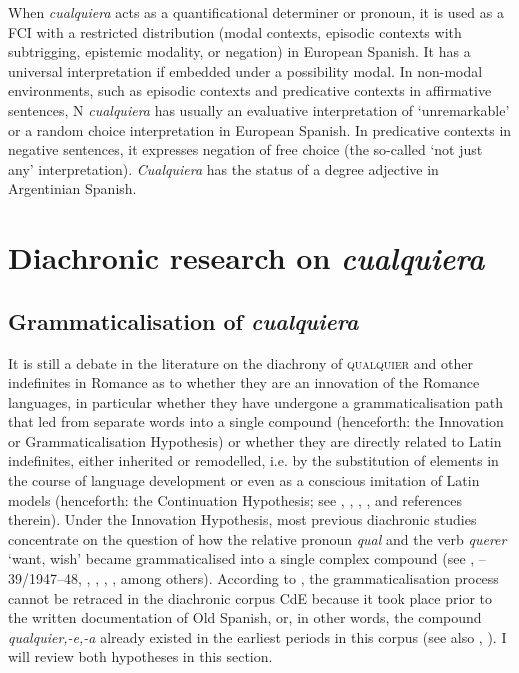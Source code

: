 When \textit{cualquiera} acts as a quantificational determiner or pronoun, it is used as a FCI with a restricted distribution (modal contexts, episodic contexts with subtrigging, epistemic modality, or negation) in European Spanish. It has a universal interpretation if embedded under a possibility modal. In non-modal environments, such as episodic contexts and predicative contexts in affirmative sentences, N \textit{cualquiera} has usually an evaluative interpretation of ‘unremarkable’ or a random choice interpretation in European Spanish. In predicative contexts in negative sentences, it expresses negation of free choice (the so-called ‘not just any’ interpretation). \textit{Cualquiera} has the status of a degree adjective in Argentinian Spanish.

\section{{Diachronic} {research} {on} {\textit{cualquiera}}} \label{sec:2.6}
\subsection{{Grammaticalisation} {of} {\textit{cualquiera}}}  \label{sec:2.6.1}

It is still a debate in the literature on the diachrony of \textsc{qualquier} and other indefinites in Romance as to whether they are an innovation of the Romance languages, in particular whether they have undergone a grammaticalisation path that led from separate words into a single compound (henceforth: the Innovation or Grammaticalisation Hypothesis) or whether they are directly related to Latin indefinites, either inherited or remodelled, i.e. by the substitution of elements in the course of language development or even as a conscious imitation of Latin models (henceforth: the Continuation Hypothesis; see \citealt{cp2009}, \citealt{Pato2012}, \citealt{Mackenzie2019}, \cite{Kellert-arias-2023}, and references therein). Under the Innovation Hypothesis, most previous diachronic studies concentrate on the question of how the relative pronoun \textit{qual} and the verb \textit{querer} ‘want, wish’ became grammaticalised into a single complex compound (see \citealt{Palomo1934}, \citealt{Lombard1938}–39/1947–48, \citealt{Meier1950}, \citealt{Rivero1988}, \citealt{Espinosa2006}, \citealt{cp2009}, among others). According to \citet{AloniEtAl2010}, the grammaticalisation process cannot be retraced in the diachronic corpus CdE because it took place prior to the written documentation of Old Spanish, or, in other words, the compound \textit{qualquier,-e,-a} already existed in the earliest periods in this corpus (see also \citealt{cp2009}, \citealt{Rivero1988}). I will review both hypotheses in this section.

